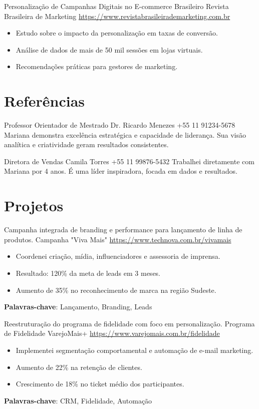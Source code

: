 \documentclass[a4paper, serif, 10pt]{moderncv}
\begin{document}
        {Personalização de Campanhas Digitais no E-commerce Brasileiro}
        {Revista Brasileira de Marketing}
        {\url{https://www.revistabrasileirademarketing.com.br}}
        {}
        {\begin{itemize}
\item Estudo sobre o impacto da personalização em taxas de conversão.
\item Análise de dados de mais de 50 mil sessões em lojas virtuais.
\item Recomendações práticas para gestores de marketing.
\end{itemize}}
\section{Referências}

        {Professor Orientador de Mestrado}
        {Dr. Ricardo Menezes}
        {+55 11 91234-5678}
        {}
        {Mariana demonstra excelência estratégica e capacidade de liderança. Sua visão analítica e criatividade geram resultados consistentes.}

        {Diretora de Vendas}
        {Camila Torres}
        {+55 11 99876-5432}
        {}
        {Trabalhei diretamente com Mariana por 4 anos. É uma líder inspiradora, focada em dados e resultados.}
\section{Projetos}

        {Campanha integrada de branding e performance para lançamento de linha de produtos.}
        {Campanha "Viva Mais"}
        {\url{https://www.technova.com.br/vivamais}}
        {}
        {\begin{itemize}
\item Coordenei criação, mídia, influenciadores e assessoria de imprensa.
\item Resultado: 120\% da meta de leads em 3 meses.
\item Aumento de 35\% no reconhecimento de marca na região Sudeste.
\end{itemize}
\textbf{Palavras-chave}: Lançamento, Branding, Leads}

        {Reestruturação do programa de fidelidade com foco em personalização.}
        {Programa de Fidelidade VarejoMais+}
        {\url{https://www.varejomais.com.br/fidelidade}}
        {}
        {\begin{itemize}
\item Implementei segmentação comportamental e automação de e-mail marketing.
\item Aumento de 22\% na retenção de clientes.
\item Crescimento de 18\% no ticket médio dos participantes.
\end{itemize}
\textbf{Palavras-chave}: CRM, Fidelidade, Automação}
\end{document}
